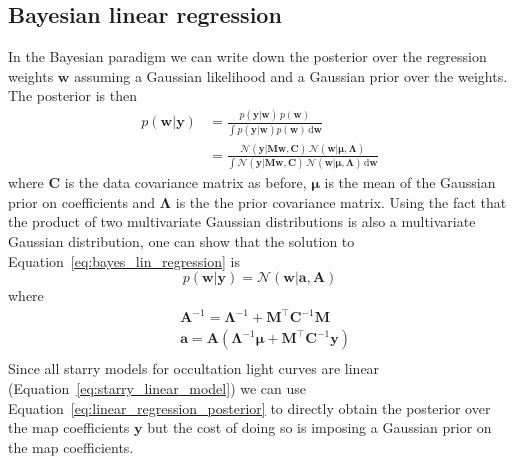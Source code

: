 \documentclass[12pt,dvipsnames]{report}
\newcommand{\ud}{\,\mathrm{d}}
\newcommand{\ssf}[1]{\textsf{#1}}
\renewcommand{\vec}[1]{\boldsymbol{\mathbf{#1}}}
\begin{document}
\subsection{Bayesian linear regression}
In the Bayesian paradigm we can write down the posterior over the regression
weights $\vec{w}$ assuming a Gaussian likelihood and a Gaussian prior over the
weights. The posterior is then
\begin{align}
    p(\vec{w}|\vec{y}) & = \frac{p(\vec{y}\lvert \vec{w})\,p(\vec{w})}{\int p(\vec{y}\lvert \vec{w})p(\vec{w}) \ud\vec{w}}                                                                                                                                                 \\
                       & = \frac{    \mathcal{N}(\vec{y} \lvert\vec{M} \vec{w}, \vec{C}) \,\mathcal{N}(\vec{w} \lvert\vec{\mu}, \vec{\Lambda})}{\int \mathcal{N}(\vec{y} \lvert\vec{M} \vec{w}, \vec{C}) \,\mathcal{N}(\vec{w} \lvert\vec{\mu}, \vec{\Lambda}) \ud\vec{w}}
    \label{eq:bayes_lin_regression}
\end{align}
where $\vec{C}$ is the data covariance matrix as before, $\vec{\mu}$ is the mean
of the Gaussian prior on coefficients and $\vec{\Lambda}$ is the the prior covariance matrix.
Using the fact that the product of two multivariate Gaussian distributions is also a
multivariate Gaussian distribution, one can show that
the solution to Equation~\ref{eq:bayes_lin_regression} is
\citep[see for example][]{arXiv:2005.14199}
\begin{equation}
    p(\vec{w}|\vec{y}) =\mathcal{N}(\vec{w} \lvert\vec{a}, \vec{A})
    \label{eq:linear_regression_posterior}
\end{equation}
where
\begin{align}
     & \vec{A}^{-1}   =\vec{\Lambda}^{-1}+\vec{M}^{\intercal} \vec{C}^{-1} \vec{M}                                                     \\
     & \vec{a}     =\vec{A} \left(\boldsymbol{\Lambda}^{-1} \boldsymbol{\mu}+\vec{M}^{\intercal} \mathbf{C}^{-1} \boldsymbol{y}\right) \\
\end{align}
Since all \ssf{starry} models for occultation light curves are linear
(Equation~\ref{eq:starry_linear_model}) we can use Equation~\ref{eq:linear_regression_posterior}
to directly obtain the posterior over the map coefficients $\mathbf{y}$ but the cost
of doing so is imposing a Gaussian prior on the map coefficients.
\end{document}
